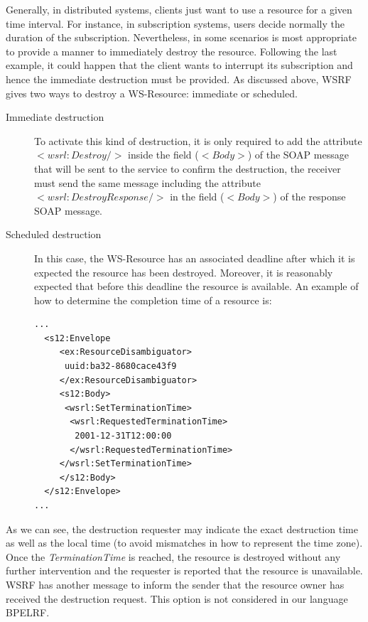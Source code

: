 Generally, in distributed systems, clients just want to use a resource for a given time interval.
For instance, in subscription systems, users decide normally the duration of the subscription.
Nevertheless, in some scenarios is most appropriate to provide a manner to immediately destroy 
the resource. Following the last example, it could happen that the client wants to interrupt its subscription 
and hence the immediate destruction must be provided. 
As discussed above, WSRF gives two ways to destroy a 
WS-Resource: immediate or scheduled.

\begin{description}
\item[Immediate destruction] To activate this kind of destruction, it is only required to add the attribute
\emph{$\!\!<\!\!wsrl\!:\!Destroy\!/\!>$} inside the field ($<Body>$) of the SOAP message that will be sent to the service
to confirm the destruction, the receiver must send the same message including the attribute
\emph{$<wsrl:DestroyResponse/>$} in the field (\emph{$<Body>$}) of the response SOAP message.

\item[Scheduled destruction] 
In this case, the WS-Resource has an associated deadline 
after which it is expected the resource has been destroyed. Moreover,
it is reasonably expected that before this deadline the resource is available. 
An example of how to determine the completion time of a resource is:

\newpage

\begin{lstlisting}
...
  <s12:Envelope
     <ex:ResourceDisambiguator>
      uuid:ba32-8680cace43f9
     </ex:ResourceDisambiguator>
     <s12:Body>
      <wsrl:SetTerminationTime>
       <wsrl:RequestedTerminationTime>
        2001-12-31T12:00:00
       </wsrl:RequestedTerminationTime>
     </wsrl:SetTerminationTime>
     </s12:Body>
  </s12:Envelope>
...
\end{lstlisting}
\end{description}

As we can see, the destruction requester may indicate 
the exact destruction time as well as the local time (to avoid mismatches in how to represent the time zone). 
Once the \emph{TerminationTime} is reached, the resource is destroyed
without any further intervention and the requester is reported that 
the resource is unavailable. WSRF has another message to 
inform the sender that the resource owner has received the destruction request. This option
is not considered in our language BPELRF.

